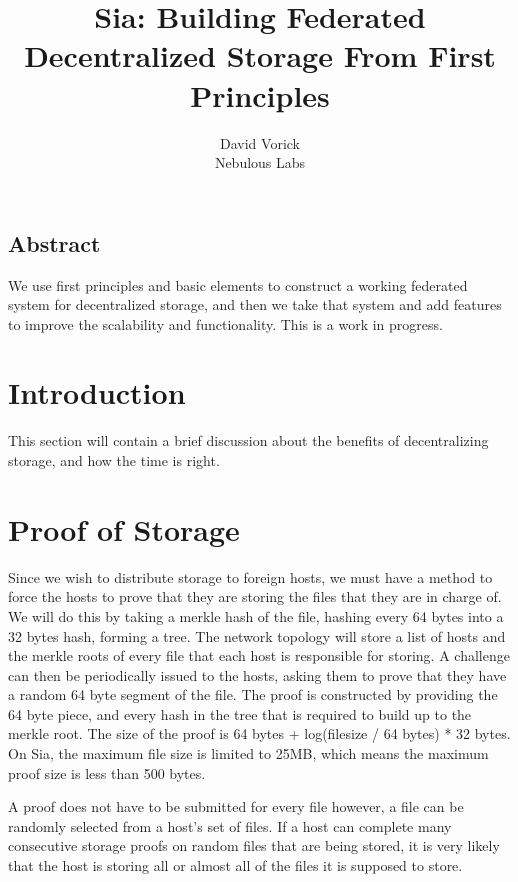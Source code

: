 \documentclass[twocolumn]{article}
\begin{document}
\frenchspacing

\title{Sia: Building Federated Decentralized Storage From First Principles}

\author{
{\rm David Vorick}\\
Nebulous Labs
}

\maketitle

\subsection*{Abstract}
We use first principles and basic elements to construct a working federated system for decentralized storage, and then we take that system and add features to improve the scalability and functionality. This is a work in progress.

\section{Introduction}
This section will contain a brief discussion about the benefits of decentralizing storage, and how the time is right.

\section{Proof of Storage}
Since we wish to distribute storage to foreign hosts, we must have a method to force the hosts to prove that they are storing the files that they are in charge of.
We will do this by taking a merkle hash of the file, hashing every 64 bytes into a 32 bytes hash, forming a tree.
The network topology will store a list of hosts and the merkle roots of every file that each host is responsible for storing.
A challenge can then be periodically issued to the hosts, asking them to prove that they have a random 64 byte segment of the file.
The proof is constructed by providing the 64 byte piece, and every hash in the tree that is required to build up to the merkle root.
The size of the proof is 64 bytes + log(filesize / 64 bytes) * 32 bytes.
On Sia, the maximum file size is limited to 25MB, which means the maximum proof size is less than 500 bytes.

A proof does not have to be submitted for every file however, a file can be randomly selected from a host's set of files.
If a host can complete many consecutive storage proofs on random files that are being stored, it is very likely that the host is storing all or almost all of the files it is supposed to store.
\end{document}

